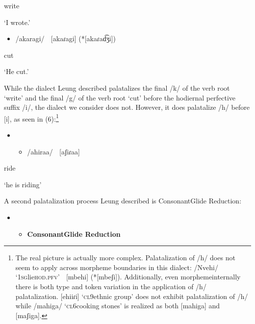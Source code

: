 write

‘I wrote.’

\begin{itemize}
\item /akaragi/    \textsc{[}akaɾagi]  (*[akaɾad͡ʒi])

\end{itemize}

cut

\textsc{‘}He cut.’

While the dialect Leung described palatalizes the final /k/ of the verb root ‘write’ and the final /g/ of the verb root ‘cut’ before the hodiernal perfective suffix /i/, the dialect we consider does not. However, it does palatalize /h/ before [i], as seen in (6):\footnote{   The real picture is actually more complex. Palatalization of /h/ does not seem to apply across morpheme boundaries in this dialect: /Nvehi/ ‘1\textsc{sg}lie\textsc{hod.pfv}’  [mbehi] (*[mbeʃi]). Additionally, even morphemeinternally there is both type and token variation in the application of /h/ palatalization. [ehiiɾi] ‘\textsc{cl}9ethnic group’ does not exhibit palatalization of /h/ while /mahiga/ ‘\textsc{cl}6cooking stones’ is realized as both [mahiga] and [maʃiga]. }

\setcounter{itemize}{0}
\begin{itemize}
\item \setcounter{itemize}{0}
\begin{itemize}
\item /ahiraa/    [aʃiɾaa]

\end{itemize}
\end{itemize}

ride

‘he is riding’

A second palatalization process Leung described is ConsonantGlide Reduction:

\begin{itemize}
\item \setcounter{itemize}{0}
\begin{itemize}
\item \textbf{Consonant}\textbf{Glide Reduction }\citep[116]{Leung1991}

\end{itemize}
\end{itemize}

